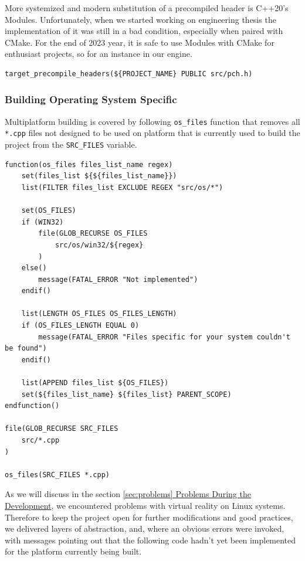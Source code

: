 More systemized and modern substitution of a precompiled header is C++20's Modules. Unfortunately, when we started working on engineering thesis the implementation of it was still in a bad condition, especially when paired with CMake. For the end of 2023 year, it is safe to use Modules with CMake for enthusiast projects, so for an instance in our engine.

\begin{lstlisting}[caption=Adding precompiled header(./engine/CMakeLists.txt)]
target_precompile_headers(${PROJECT_NAME} PUBLIC src/pch.h)
\end{lstlisting}

\subsubsection{Building Operating System Specific}
\label{sec:build_os}
\hspace{\parindent} Multiplatform building is covered by following \texttt{os\_files} function that removes all \texttt{*.cpp} files not designed to be used on platform that is currently used to build the project from the \texttt{SRC\_FILES} variable.
\label{lst:os}
\begin{lstlisting}[caption=\texttt{os\_files} function (./engine/CMakeLists.txt)]
function(os_files files_list_name regex)
    set(files_list ${${files_list_name}})
    list(FILTER files_list EXCLUDE REGEX "src/os/*")

    set(OS_FILES)
    if (WIN32)
        file(GLOB_RECURSE OS_FILES
            src/os/win32/${regex}
        )
    else()
        message(FATAL_ERROR "Not implemented")
    endif()

    list(LENGTH OS_FILES OS_FILES_LENGTH)
    if (OS_FILES_LENGTH EQUAL 0)
        message(FATAL_ERROR "Files specific for your system couldn't be found")
    endif()

    list(APPEND files_list ${OS_FILES})
    set(${files_list_name} ${files_list} PARENT_SCOPE)
endfunction()

file(GLOB_RECURSE SRC_FILES
    src/*.cpp
)

os_files(SRC_FILES *.cpp)
\end{lstlisting}

As we will discuss in the section \hyperref[sec:problems]{\ref{sec:problems} Problems During the Development}, we encountered problems with virtual reality on Linux systems. Therefore to keep the project open for further modifications and good practices, we delivered layers of abstraction, and, where an obvious errors were invoked, with messages pointing out that the following code hadn't yet been implemented for the platform currently being built.

